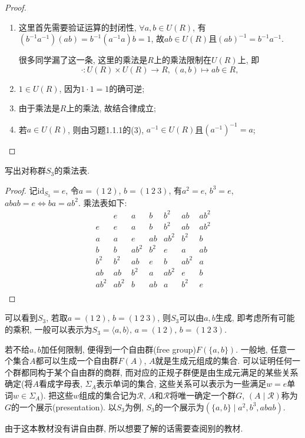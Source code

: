 \documentclass{../solutions-cn}
\begin{document}
\begin{proof}
    \begin{enumerate}[(1)]
        \item 这里首先需要验证运算的封闭性, $\forall a, b \in U(R)$, 有$(b^{-1}a^{-1})(ab) = b^{-1}(a^{-1}a)b = 1$, 故$ab \in U(R)$且$(ab)^{-1} = b^{-1}a^{-1}$.

        很多同学漏了这一条, 这里的乘法是$R$上的乘法限制在$U(R)$上, 即
        \[
            \cdot: U(R) \times U(R) \to R,\, (a, b) \mapsto ab \in R,
        \]
        \item $1 \in U(R)$, 因为$1 \cdot 1 = 1$的确可逆;
        \item 由于乘法是$R$上的乘法, 故结合律成立;
        \item 若$a \in U(R)$, 则由习题1.1.1的(3), $a^{-1} \in U(R)$且$(a^{-1})^{-1} = a$;
    \end{enumerate}
\end{proof}

\begin{exercise}[习题1.3.5]
    写出对称群$S_3$的乘法表.
\end{exercise}

\begin{proof}
    记$\mathrm{id}_{S_3} = e$, 令$a = (1\:2)$, $b = (1\:2\:3)$, 有$a^2 = e$, $b^3 = e$, $abab = e \iff ba = ab^2$. 乘法表如下:
    \[
        \begin{array}{c|cccccc}
            & e    & a    & b   & b^2  & ab   & ab^2 \\
       \hline
       e    & e    & a    & b   & b^2  & ab   & ab^2 \\
       a    & a    & e    & ab  & ab^2 & b^2  & b \\
       b    & b    & ab^2 & b^2 & e    & a    & ab \\
       b^2  & b^2  & ab   & e   & b    & ab^2 & a \\
       ab   & ab   & b^2  & a   & ab^2 & e    & b \\
       ab^2 & ab^2 & b    & ab  & a    & b^2  & e \\
   \end{array}
   \]
\end{proof}

\begin{remark}
    可以看到$S_3$, 若取$a = (1\:2),\, b = (1\:2\:3)$, 则$S_3$可以由$a, b$生成, 即考虑所有可能的乘积, 一般可以表示为$S_3 = \langle a, b \rangle,\, a = (1\:2),\, b = (1\:2\:3)$.
    
    若不给$a, b$加任何限制, 便得到一个自由群(free group)$F(\{a, b\})$. 一般地, 任意一个集合$A$都可以生成一个自由群$F(A)$, $A$就是生成元组成的集合. 可以证明任何一个群都同构于某个自由群的商群, 而对应的正规子群便是由生成元满足的某些关系确定(将$A$看成字母表, $\Sigma_A$表示单词的集合, 这些关系可以表示为一些满足$w = e$单词$w \in \Sigma_A$). 把这些$w$组成的集合记为$\mathscr{R}$, $A$和$\mathscr{R}$将唯一确定一个群$G$, $(A \mid \mathscr{R})$称为$G$的一个展示(presentation). 以$S_3$为例, $S_3$的一个展示为$(\{a, b\} \mid a^2, b^3, abab)$.
    
    由于这本教材没有讲自由群, 所以想要了解的话需要查阅别的教材.
\end{remark}
\end{document}
